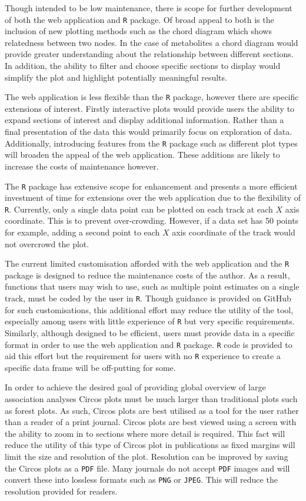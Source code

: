 \documentclass[11pt,twoside]{bristolthesis}
\begin{document}
Though intended to be low maintenance, there is scope for further development of both the web application and \texttt{R} package. Of broad appeal to both is the inclusion of new plotting methods such as the chord diagram which shows relatedness between two nodes. In the case of metabolites a chord diagram would provide greater understanding about the relationship between different sections. In addition, the ability to filter and choose specific sections to display would simplify the plot and highlight potentially meaningful results.

The web application is less flexible than the \texttt{R} package, however there are specific extensions of interest. Firstly interactive plots would provide users the ability to expand sections of interest and display additional information. Rather than a final presentation of the data this would primarily focus on exploration of data. Additionally, introducing features from the \texttt{R} package such as different plot types will broaden the appeal of the web application. These additions are likely to increase the costs of maintenance however.

The \texttt{R} package has extensive scope for enhancement and presents a more efficient investment of time for extensions over the web application due to the flexibility of \texttt{R}. Currently, only a single data point can be plotted on each track at each \(X\) axis coordinate. This is to prevent over-crowding. However, if a data set has 50 points for example, adding a second point to each \(X\) axis coordinate of the track would not overcrowd the plot.

The current limited customisation afforded with the web application and the \texttt{R} package is designed to reduce the maintenance costs of the author. As a result, functions that users may wish to use, such as multiple point estimates on a single track, must be coded by the user in \texttt{R}. Though guidance is provided on GitHub for such customisations, this additional effort may reduce the utility of the tool, especially among users with little experience of \texttt{R} but very specific requirements. Similarly, although designed to be efficient, users must provide data in a specific format in order to use the web application and \texttt{R} package. \texttt{R} code is provided to aid this effort but the requirement for users with no \texttt{R} experience to create a specific data frame will be off-putting for some.

In order to achieve the desired goal of providing global overview of large association analyses Circos plots must be much larger than traditional plots such as forest plots. As such, Circos plots are best utilised as a tool for the user rather than a reader of a print journal. Circos plots are best viewed using a screen with the ability to zoom in to sections where more detail is required. This fact will reduce the utility of this type of Circos plot in publications as fixed margins will limit the size and resolution of the plot. Resolution can be improved by saving the Circos plots as a \texttt{PDF} file. Many journals do not accept \texttt{PDF} images and will convert these into lossless formats such as \texttt{PNG} or \texttt{JPEG}. This will reduce the resolution provided for readers.
\end{document}
